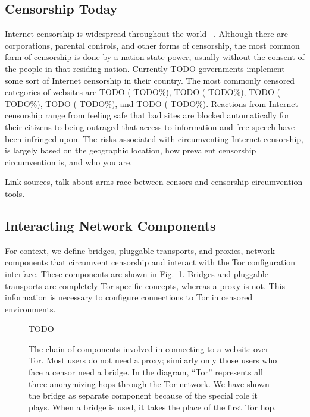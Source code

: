 \documentclass[USenglish,oneside,twocolumn]{article}
\begin{document}
\subsection{Censorship Today} 
Internet censorship is widespread throughout the world ~\cite{faris2008measuring}. Although there are corporations, parental controls, and other forms of censorship, the most common form of censorship is done by a nation-state power, usually without the consent of the people in that residing nation. Currently {\color {red} TODO} governments implement some sort of Internet censorship in their country. The most commonly censored categories of websites are {\color {red} TODO} ({\color {red} TODO}\%), {\color {red} TODO} ({\color {red} TODO}\%), {\color {red} TODO} ({\color {red} TODO}\%), {\color {red} TODO} ({\color {red} TODO}\%), and {\color {red} TODO} ({\color {red} TODO}\%).  Reactions from Internet censorship range from feeling safe that bad sites are blocked automatically for their citizens to being outraged that access to information and free speech have been infringed upon. The risks associated with circumventing Internet censorship, is largely based on the geographic location, how prevalent censorship circumvention is, and who you are. 

{\color{red} Link sources, talk about arms race between censors and censorship circumvention tools.} 

\subsection{Interacting Network Components} 
For context, we define bridges, pluggable transports, and proxies, network components that 
circumvent censorship and interact with the Tor configuration interface. 
These components are shown in Fig.~\ref{fig:topology}.
Bridges and pluggable transports are completely Tor-specific concepts, whereas a proxy is not.  
This information is necessary to configure connections to Tor in censored environments. 

\begin{figure}
\centering
{\color{red} TODO}
\caption{
The chain of components involved in connecting to a website over Tor.
Most users do not need a proxy;
similarly only those users who face a censor need a bridge.
In the diagram, ``Tor'' represents all three anonymizing hops through the Tor network.
We have shown the bridge as separate component
because of the special role it plays.
When a bridge is used, it takes the place of the first Tor hop.
}
\label{fig:topology}
\end{figure}
\end{document}
